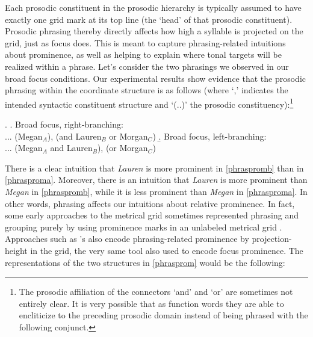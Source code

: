 \documentclass[preprint,review,12pt,authoryear,times]{elsarticle}
\begin{document}
Each prosodic constituent in the prosodic hierarchy is typically assumed  to have exactly one grid mark at its top line (the `head' of that prosodic constituent). Prosodic phrasing thereby directly affects how high a syllable is projected on the grid,  just as focus does. This is meant to capture phrasing-related intuitions about prominence, as well as helping to explain where tonal targets will be realized within a phrase.  Let's consider the two phrasings we observed in our broad focus conditions. Our experimental results show evidence that the prosodic phrasing within the coordinate structure is as follows (where `,' indicates the intended syntactic constituent structure and `(..)' the prosodic constituency):\footnote{The prosodic affiliation of the connectors `and' and `or' are sometimes not entirely clear. It is very possible that as function words they are able to encliticize to the preceding prosodic domain instead of being phrased with the following conjunct.}


\ex.\label{phrasprom}
\a. Broad focus, right-branching:\\
... (Megan$_A$), (and Lauren$_B$ or Morgan$_C$) \label{phrasproma}
\b. Broad focus, left-branching:\\
... (Megan$_A$ and Lauren$_B$), (or Morgan$_C$) \label{phraspromb}

There is a clear intuition that {\em Lauren} is more prominent in \ref{phraspromb} than in \ref{phrasproma}.  Moreover, there is an intuition that {\em Lauren} is more prominent than {\em Megan} in  \ref{phraspromb}, while it is less prominent than {\em Megan} in \ref{phrasproma}. In other words, phrasing affects our intuitions about relative prominence. In fact, some early approaches to the metrical grid sometimes represented phrasing and grouping purely by using prominence marks in an unlabeled metrical grid \citep[e.g.][]{princ83}. Approaches such as \citet{truck95}'s also encode phrasing-related prominence by projection-height in the grid, the very same tool also used to encode focus prominence. The representations of the two structures in \ref{phrasprom} would be the following:
\end{document}
